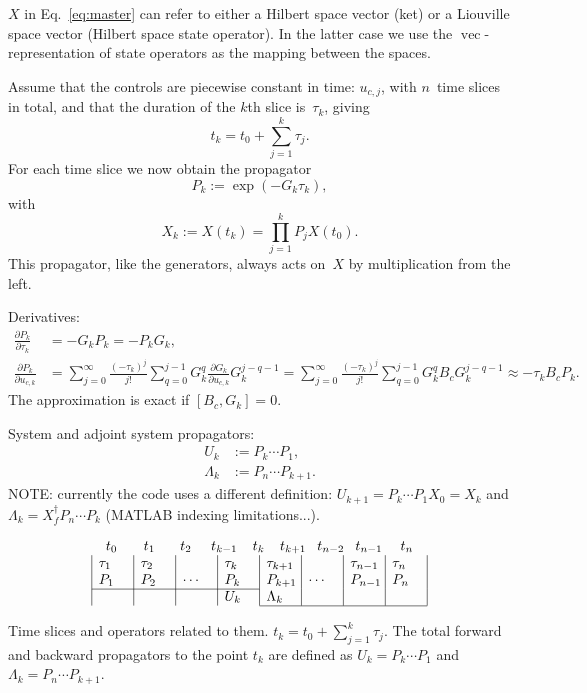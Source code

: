 \documentclass[aps, pra, a4paper, longbibliography]{revtex4}
\newcommand{\be}{\begin{equation}}
\newcommand{\ee}{\end{equation}}
\newcommand{\comm}[2]{\left[ #1, #2 \right]}
\DeclareMathOperator{\cvec}{vec}
\newcommand{\dd}[2]{\frac{\partial #1}{\partial #2}}
\begin{document}
$X$ in Eq.~\eqref{eq:master} can refer to either a Hilbert space
vector (ket) or a Liouville space vector (Hilbert space state operator).
In the latter case we use the $\cvec$-representation of state
operators as the mapping between the spaces.




Assume that the controls are
piecewise constant in time: $u_{c,j}$, with $n$~time slices in total,
and that the duration of the $k$th slice is~$\tau_k$, giving
\be
t_k = t_0 + \sum_{j=1}^{k} \tau_j.
\ee
For each time slice we now obtain the propagator
\be
P_k := \exp(-G_k \tau_k),
\ee
with
\be
X_k := X(t_k) = \prod_{j=1}^{k} P_j X(t_0).
\ee
This propagator, like the generators, always acts on~$X$ by multiplication
from the left.

Derivatives:
\begin{align}
\dd{P_k}{\tau_k}  &= -G_k P_k = -P_k G_k,\\
\dd{P_k}{u_{c,k}}
&=
\sum_{j=0}^{\infty} \frac{(-\tau_k)^j}{j!}
\sum_{q=0}^{j-1}
G_k^{q} \dd{G_k}{u_{c,k}} G_k^{j-q-1}
=
\sum_{j=0}^{\infty} \frac{(-\tau_k)^j}{j!}
\sum_{q=0}^{j-1}
G_k^{q} B_c G_k^{j-q-1}
\approx -\tau_k B_c P_k.
\end{align}
The approximation is exact if $\comm{B_c}{G_k} = 0$.


System and adjoint system propagators:
\begin{align}
U_k &:= P_k \cdots P_1,\\      %
\Lambda_k &:= P_n \cdots P_{k+1}.
\end{align}
NOTE: currently the code uses a different definition:
$U_{k+1} = P_k \cdots P_1 X_0 = X_k$ and
$\Lambda_k = X_f^\dagger P_n \cdots P_k$ (MATLAB indexing limitations...).

\begin{table}[h]
\[
\begin{array}{c}
\begin{array}{@{t_0}p{1.9em}@{t_1}p{1.8em}@{t_2}p{1.4em}@{t_{k-1}}p{1.1em}@{t_{k}}p{1.1em}@{t_{k+1}}p{0.8em}@{t_{n-2}}p{0.8em}@{t_{n-1}}p{1.3em}@{t_n}}
& & & & & & &
\end{array}\\
\begin{array}{|p{2em}|p{2em}|p{2em}|p{2em}|p{2em}|p{2em}|p{2em}|p{2em}|}
 $\tau_1$ & $\tau_2$ & & $\tau_k$ & $\tau_{k+1}$ & & $\tau_{n-1}$ & $\tau_n$ \\
 $P_1$ & $P_2$ & $\cdots$ & $P_k$ & $P_{k+1}$ & $\cdots$ & $P_{n-1}$ & $P_n$ \\
\cline{1-4}
& & & $U_{k}$ & $\Lambda_{k}$ & & & \\
\cline{5-8}
\end{array}
\end{array}
\]
\caption{Time slices and operators related to them.
$t_k = t_0 + \sum_{j=1}^{k} \tau_j$.
The total forward and backward
propagators to the point $t_k$ are defined as
$U_k = P_k \cdots P_1$ and
$\Lambda_k = P_{n} \cdots P_{k+1}$.}
\end{table}
\end{document}
